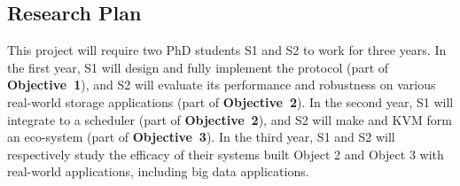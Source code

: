 \vspace{-.15in}\subsection{Research Plan} \label{sec:plan}\vspace{-.075in}

This project will require two PhD students S1 and S2 to work for 
three years. In the first year, S1 will design and fully implement the \falcon 
protocol (part of \textbf{Objective~1}), and S2 will evaluate its performance 
and robustness on various real-world storage applications (part of 
\textbf{Objective~2}). In the second year, S1 will 
integrate \falcon to a scheduler \mesos (part of \textbf{Objective~2}), and S2 
will make \falcon and KVM form an eco-system (part of \textbf{Objective~3}). In 
the third year, S1 and S2 will respectively study the efficacy of their systems 
built Object 2 and Object 3 with real-world applications, including big data 
applications.


